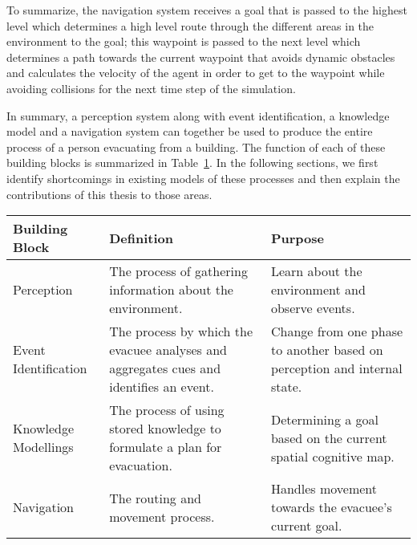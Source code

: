     To summarize, the navigation system receives a goal that is passed to the highest level which determines a high level route through the different areas in the environment to the goal; this waypoint is passed to the next level which determines a path towards the current waypoint that avoids dynamic obstacles and calculates the velocity of the agent in order to get to the waypoint while avoiding collisions for the next time step of the simulation.




In summary, a perception system along with event identification, a knowledge model and a navigation system can together be used to produce the entire process of a person evacuating from a building. The function of each of these building blocks is summarized in Table~\ref{tab:BuildingBlocks}. In the following sections, we first identify shortcomings in existing models of these processes and then explain the contributions of this thesis to those areas.

\begin{table}[tbp]
\centering
{} %
\begin{tabular}{p{1.0in}   p{2.1in}   p{2.4in}} %
\hline\hline %
Building Block & Definition & Purpose \\
\hline
Perception  & The process of gathering information about the environment. & Learn about the environment and observe events.\\[3pt]
Event Identification & The process by which the evacuee analyses and aggregates cues and identifies an event.  & Change from one phase to another based on perception and internal state.\\[3pt]
Knowledge Modellings & The process of using stored knowledge to formulate a plan for evacuation. & Determining a goal based on the current spatial cognitive map. \\[3pt]
Navigation & The routing and movement process. & Handles movement towards the evacuee's current goal. \\[3pt]
\bottomrule
\end{tabular}
\label{tab:BuildingBlocks}
\end{table}

